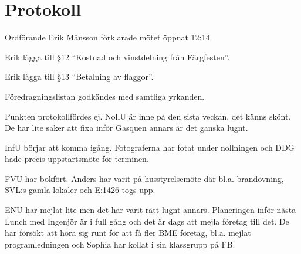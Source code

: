 \documentclass[10pt]{article}
\def\mo{Erik Månsson}
\begin{document}
\section*{Protokoll}
\begin{paragrafer}
Ordförande {\mo} förklarade mötet öppnat 12:14.

{\valavmo}

{\valavms}

{\valavj}

{\tosg}

{\ingaadj}


Erik \ypa lägga till \S12 ``Kostnad och vinstdelning från Färgfesten''.

Erik \ypa lägga till \S13 ``Betalning av flaggor''.

Föredragningslistan godkändes med samtliga yrkanden.

\begin{fyllnadsval} %
\end{fyllnadsval}

\begin{paragrafer}
Punkten protokollfördes ej.
NollU är inne på den sista veckan, det känns skönt. De har lite saker att fixa inför Gasquen annars är det ganska lugnt.

InfU börjar att komma igång. Fotograferna har fotat under nollningen och DDG hade precis uppstartsmöte för terminen.

FVU har bokfört. Anders har varit på husstyrelsemöte där bl.a. brandövning, SVL:s gamla lokaler och E:1426 togs upp.

ENU har mejlat lite men det har varit rätt lugnt annars. Planeringen inför nästa Lunch med Ingenjör är i full gång och det är dags att mejla företag till det. De har försökt att höra sig runt för att få fler BME företag, bl.a. mejlat programledningen och Sophia har kollat i sin klassgrupp på FB.


\end{paragrafer}
\end{paragrafer}
\end{document}
